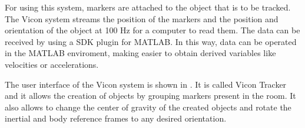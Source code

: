 For using this system, markers are attached to the object that is to be tracked. The Vicon system streams the position of the markers and the position and orientation of the object at 100 Hz for a computer to read them. The data can be received by using a SDK plugin for MATLAB. In this way, data can be operated in the MATLAB enviroment, making easier to obtain derived variables like velocities or accelerations.

The user interface of the Vicon system is shown in . It is called Vicon Tracker and it allows the creation of objects by grouping markers present in the room. It also allows to change the center of gravity of the created objects and rotate the inertial and body reference frames to any desired orientation.
